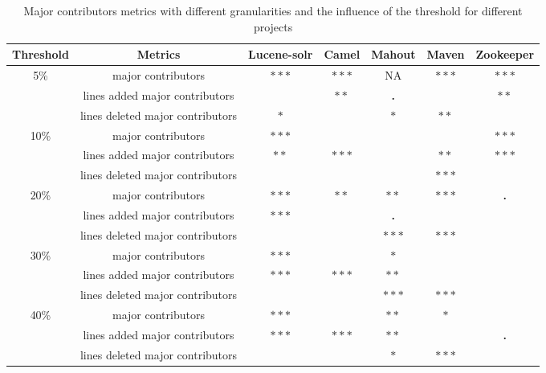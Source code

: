 \begin{table}[ht]
\centering
\caption{Major contributors metrics with different granularities and the influence of the threshold for different projects}
\label{tab:experiment2_threshold}
\begin{tabular}{|c|c|c|c|c|c|c|}
\hline
\textbf{Threshold} & \textbf{Metrics} & \textbf{Lucene-solr} & \textbf{Camel} & \textbf{Mahout} & \textbf{Maven} & \textbf{Zookeeper} \\
\hline
\multirow{3}{*}{5\%} & major contributors & \textbf{$\ast\ast\ast$} & \textbf{$\ast\ast\ast$} & NA & \textbf{$\ast\ast\ast$} & \textbf{$\ast\ast\ast$} \\
 & lines added major contributors & \textbf{} & \textbf{$\ast\ast$} & \textbf{.} & \textbf{} & \textbf{$\ast\ast$} \\
 & lines deleted major contributors & \textbf{$\ast$} & \textbf{} & \textbf{$\ast$} & \textbf{$\ast\ast$} & \textbf{} \\
\hline
\multirow{3}{*}{10\%} & major contributors & \textbf{$\ast\ast\ast$} & \textbf{} & \textbf{} & \textbf{} & \textbf{$\ast\ast\ast$} \\
 & lines added major contributors & \textbf{$\ast\ast$} & \textbf{$\ast\ast\ast$} & \textbf{} & \textbf{$\ast\ast$} & \textbf{$\ast\ast\ast$} \\
 & lines deleted major contributors & \textbf{} & \textbf{} & \textbf{} & \textbf{$\ast\ast\ast$} & \textbf{} \\
\hline
\multirow{3}{*}{20\%} & major contributors & \textbf{$\ast\ast\ast$} & \textbf{$\ast\ast$} & \textbf{$\ast\ast$} & \textbf{$\ast\ast\ast$} & \textbf{.} \\
 & lines added major contributors & \textbf{$\ast\ast\ast$} & \textbf{} & \textbf{.} & \textbf{} & \textbf{} \\
 & lines deleted major contributors & \textbf{} & \textbf{} & \textbf{$\ast\ast\ast$} & \textbf{$\ast\ast\ast$} & \textbf{} \\
\hline
\multirow{3}{*}{30\%} & major contributors & \textbf{$\ast\ast\ast$} & \textbf{} & \textbf{$\ast$} & \textbf{} & \textbf{} \\
 & lines added major contributors & \textbf{$\ast\ast\ast$} & \textbf{$\ast\ast\ast$} & \textbf{$\ast\ast$} & \textbf{} & \textbf{} \\
 & lines deleted major contributors & \textbf{} & \textbf{} & \textbf{$\ast\ast\ast$} & \textbf{$\ast\ast\ast$} & \textbf{} \\
\hline
\multirow{3}{*}{40\%} & major contributors & \textbf{$\ast\ast\ast$} & \textbf{} & \textbf{$\ast\ast$} & \textbf{$\ast$} & \textbf{} \\
 & lines added major contributors & \textbf{$\ast\ast\ast$} & \textbf{$\ast\ast\ast$} & \textbf{$\ast\ast$} & \textbf{} & \textbf{.} \\
 & lines deleted major contributors & \textbf{} & \textbf{} & \textbf{$\ast$} & \textbf{$\ast\ast\ast$} & \textbf{}\\
 \hline
\end{tabular}
\end{table}




